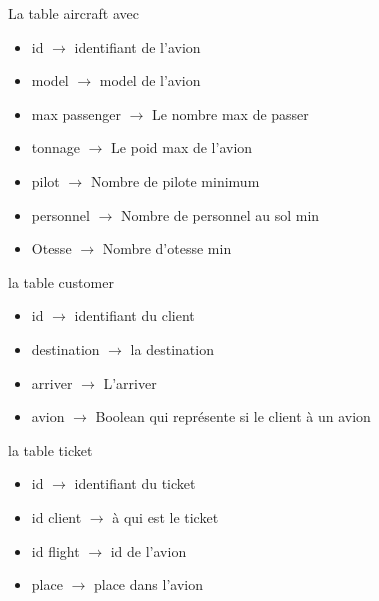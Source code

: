 \documentclass{article}
\begin{document}
        La table aircraft avec 
        
            \begin{itemize}
                \centering
                \item id $\rightarrow$ identifiant de l'avion
                \item model $\rightarrow$ model de l'avion
                \item max passenger $\rightarrow$ Le nombre max de passer                 
                \item tonnage $\rightarrow$ Le poid max de l'avion
                \item pilot $\rightarrow$ Nombre de pilote minimum
                \item personnel $\rightarrow$ Nombre de personnel au sol min
                \item Otesse $\rightarrow$ Nombre d'otesse min                
            \end{itemize}
        
        la table customer
            \begin{itemize}
                \centering
                \item id $\rightarrow$ identifiant du client
                \item destination $\rightarrow$ la destination
                \item arriver $\rightarrow$ L'arriver               
                \item avion $\rightarrow$ Boolean qui représente si le client à un avion             
            \end{itemize}
        
        la table ticket
            \begin{itemize}
                \centering
                \item id $\rightarrow$ identifiant du ticket 
                \item id client $\rightarrow$ à qui est le ticket 
                \item id flight $\rightarrow$ id de l'avion
                \item place $\rightarrow$ place dans l'avion
            \end{itemize}
            
\end{document}
